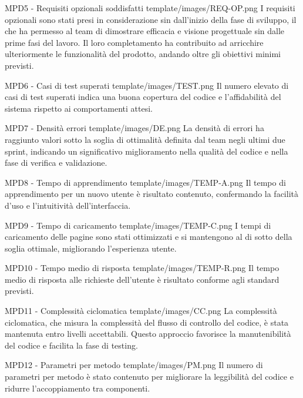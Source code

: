 \MetNoPB
{ %
    MPD5 - Requisiti opzionali soddisfatti    
}
{ %
    template/images/REQ-OP.png
}
{   %
I requisiti opzionali sono stati presi in considerazione sin dall'inizio della fase di sviluppo, il che ha permesso al team di dimostrare efficacia e visione progettuale sin dalle prime fasi del lavoro. Il loro completamento ha contribuito ad arricchire ulteriormente le funzionalità del prodotto, andando oltre gli obiettivi minimi previsti.
}

\MetNoPB
{ %
    MPD6 - Casi di test superati     
}
{ %
    template/images/TEST.png
}
{   %
    Il numero elevato di casi di test superati indica una buona copertura del codice e l’affidabilità del sistema rispetto ai comportamenti attesi.
}

\MetNoPB
{ %
    MPD7 - Densità errori
}
{ %
    template/images/DE.png
}
{   %
La densità di errori ha raggiunto valori sotto la soglia di ottimalità definita dal team negli ultimi due sprint, indicando un significativo miglioramento nella qualità del codice e nella fase di verifica e validazione.
}

\MetNoPB
{ %
    MPD8 - Tempo di apprendimento    
}
{ %
    template/images/TEMP-A.png
}
{   %
    Il tempo di apprendimento per un nuovo utente è risultato contenuto, confermando la facilità d’uso e l’intuitività dell’interfaccia.
}

\MetNoPB
{ %
    MPD9 - Tempo di caricamento    
}
{ %
    template/images/TEMP-C.png
}
{   %
    I tempi di caricamento delle pagine sono stati ottimizzati e si mantengono al di sotto della soglia ottimale, migliorando l’esperienza utente.
}

\MetNoPB
{ %
    MPD10 - Tempo medio di risposta    
}
{ %
    template/images/TEMP-R.png
}
{   %
    Il tempo medio di risposta alle richieste dell’utente è risultato conforme agli standard previsti.
}

\MetNoPB
{ %
    MPD11 - Complessità ciclomatica 
}
{ %
    template/images/CC.png
}
{   %
    La complessità ciclomatica, che misura la complessità del flusso di controllo del codice, è stata mantenuta entro livelli accettabili. Questo approccio favorisce la manutenibilità del codice e facilita la fase di testing.
}

\MetNoPB
{ %
    MPD12 - Parametri per metodo
}
{ %
    template/images/PM.png
}
{   %
    Il numero di parametri per metodo è stato contenuto per migliorare la leggibilità del codice e ridurre l'accoppiamento tra componenti.
}

